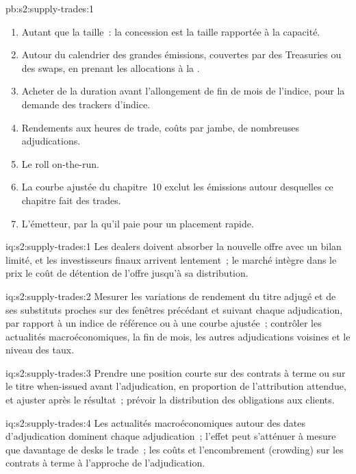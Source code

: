 \begin{solution}{pb:s2:supply-trades:1}
\begin{enumerate}
taille ajoute 0.24 point de base en moyenne, bien que le résultat d'une adjudication isolée reste du bruit.
\item Autant que la taille~: la concession est la taille rapportée à la capacité.
\item Autour du calendrier des grandes émissions, couvertes par des Treasuries ou des swaps, en prenant les allocations à la .
\item Acheter de la duration avant l'allongement de fin de mois de l'indice, pour la demande des trackers d'indice.
\item Rendements aux heures de trade, coûts par jambe, de nombreuses adjudications.
\item Le roll on-the-run.
\item La courbe ajustée du chapitre~10 exclut les émissions autour desquelles ce chapitre fait des trades.
\item L'émetteur, par la  qu'il paie pour un placement rapide.
\end{enumerate}
\end{solution}

\begin{solution}{iq:s2:supply-trades:1}
Les dealers doivent absorber la nouvelle offre avec un bilan limité, et les investisseurs finaux arrivent lentement~; le marché intègre dans le prix le coût de détention de
l'offre jusqu'à sa distribution.
\end{solution}

\begin{solution}{iq:s2:supply-trades:2}
Mesurer les variations de rendement du titre adjugé et de ses substituts proches sur des fenêtres précédant et suivant chaque adjudication, par rapport à un indice de référence ou à une
courbe ajustée~; contrôler les actualités macroéconomiques, la fin de mois, les autres adjudications voisines et le niveau des taux.
\end{solution}

\begin{solution}{iq:s2:supply-trades:3}
Prendre une position courte sur des contrats à terme ou sur le titre when-issued avant l'adjudication, en proportion de l'attribution attendue, et ajuster après le résultat~; prévoir la
distribution des obligations aux clients.
\end{solution}

\begin{solution}{iq:s2:supply-trades:4}
Les actualités macroéconomiques autour des dates d'adjudication dominent chaque adjudication~; l'effet peut s'atténuer à mesure que davantage de desks le trade~; les coûts et l'encombrement (crowding) sur les contrats à terme à l'approche de
l'adjudication.
\end{solution}

